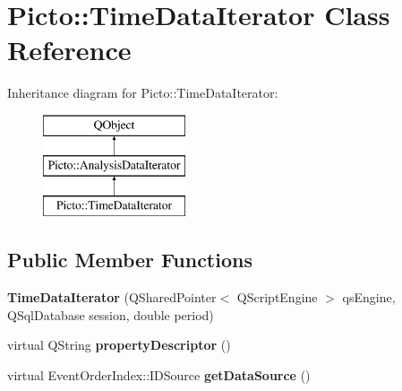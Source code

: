 \hypertarget{class_picto_1_1_time_data_iterator}{\section{Picto\-:\-:Time\-Data\-Iterator Class Reference}
\label{class_picto_1_1_time_data_iterator}
}
Inheritance diagram for Picto\-:\-:Time\-Data\-Iterator\-:\begin{figure}[H]
\begin{center}
\leavevmode
\includegraphics[height=3.000000cm]{class_picto_1_1_time_data_iterator}
\end{center}
\end{figure}
\subsection*{Public Member Functions}
\begin{DoxyCompactItemize}
\item 
\hypertarget{class_picto_1_1_time_data_iterator_a9474e748f1131165d60db55a347d7b2b}{{\bfseries Time\-Data\-Iterator} (Q\-Shared\-Pointer$<$ Q\-Script\-Engine $>$ qs\-Engine, Q\-Sql\-Database session, double period)}\label{class_picto_1_1_time_data_iterator_a9474e748f1131165d60db55a347d7b2b}

\item 
\hypertarget{class_picto_1_1_time_data_iterator_ab8e3e162c62dbed42600ecc8c3f2e3cd}{virtual Q\-String {\bfseries property\-Descriptor} ()}\label{class_picto_1_1_time_data_iterator_ab8e3e162c62dbed42600ecc8c3f2e3cd}

\item 
\hypertarget{class_picto_1_1_time_data_iterator_ac53d4426dcb1ea75ce07485dbfefb408}{virtual Event\-Order\-Index\-::\-I\-D\-Source {\bfseries get\-Data\-Source} ()}\label{class_picto_1_1_time_data_iterator_ac53d4426dcb1ea75ce07485dbfefb408}

\end{DoxyCompactItemize}
